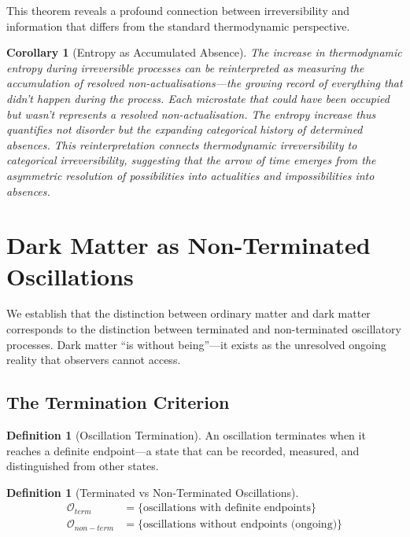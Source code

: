 \documentclass[12pt,a4paper]{article}
\newtheorem{corollary}[theorem]{Corollary}
\theoremstyle{definition}
\newtheorem{definition}[theorem]{Definition}
\theoremstyle{remark}
\begin{document}
This theorem reveals a profound connection between irreversibility and information that differs from the standard thermodynamic perspective.

\begin{corollary}[Entropy as Accumulated Absence]
The increase in thermodynamic entropy during irreversible processes can be reinterpreted as measuring the accumulation of resolved non-actualisations—the growing record of everything that didn't happen during the process. Each microstate that could have been occupied but wasn't represents a resolved non-actualisation. The entropy increase thus quantifies not disorder but the expanding categorical history of determined absences. This reinterpretation connects thermodynamic irreversibility to categorical irreversibility, suggesting that the arrow of time emerges from the asymmetric resolution of possibilities into actualities and impossibilities into absences.
\end{corollary}




\section{Dark Matter as Non-Terminated Oscillations}
\label{sec:dark_termination}

We establish that the distinction between ordinary matter and dark matter corresponds to the distinction between terminated and non-terminated oscillatory processes. Dark matter ``is without being''---it exists as the unresolved ongoing reality that observers cannot access.

\subsection{The Termination Criterion}

\begin{definition}[Oscillation Termination]
An oscillation terminates when it reaches a definite endpoint—a state that can be recorded, measured, and distinguished from other states.
\end{definition}

\begin{definition}[Terminated vs Non-Terminated Oscillations]
\begin{align}
\mathcal{O}_{term} &= \{\text{oscillations with definite endpoints}\} \\
\mathcal{O}_{non-term} &= \{\text{oscillations without endpoints (ongoing)}\}
\end{align}
\end{definition}
\end{document}
